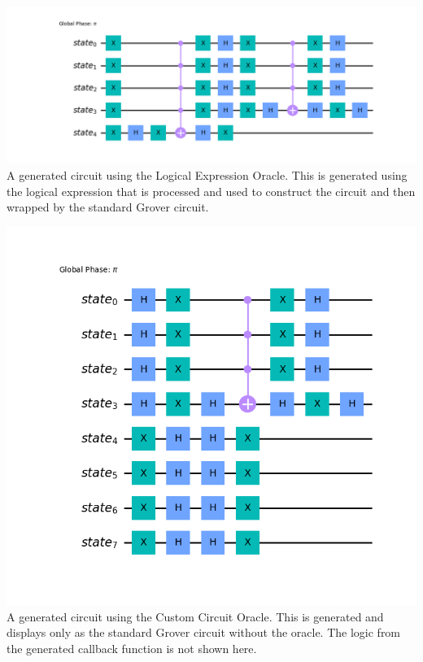 \documentclass[11pt]{article}
\begin{document}
\\\
\\\
\\\
\begin{center}
\includegraphics[width=\textwidth]{logical_expression_grover.png}
A generated circuit using the Logical Expression Oracle. This is generated using the logical expression that is processed and used to construct the circuit and then wrapped by the standard Grover circuit.
\end{center}

\begin{center}

\includegraphics[width=\textwidth]{custom_circuit_grover.png}
A generated circuit using the Custom Circuit Oracle. This is generated and displays only as the standard Grover circuit without the oracle. The logic from the generated callback function is not shown here.
\end{center}
\end{document}
